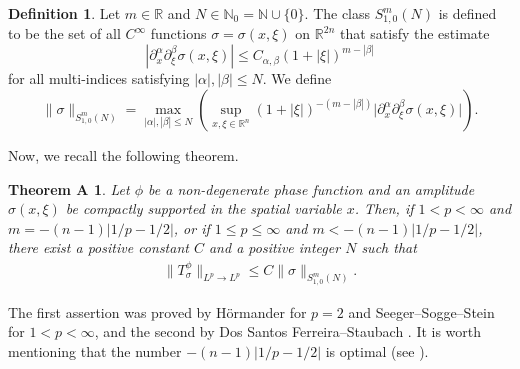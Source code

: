 \documentclass[12pt]{amsart}
\numberwithin{equation}{section}
\theoremstyle{plain}
\newtheorem*{referthmA}{Theorem A}
\theoremstyle{definition}
\newtheorem{defn}[thm]{Definition}
\newcommand{\N}{\mathbb{N}}
\newcommand{\R}{\mathbb{R}}
\begin{document}
\begin{defn} \label{def-Sm10} 
Let $m\in \R$ and $N \in \N_{0} = \N \cup \{0\}$. 
The class $S^{m}_{1,0} (N)$ 
is defined to be the set of all 
$C^{\infty}$ functions $\sigma = \sigma (x, \xi)$ 
on $\R^{2n}$ 
that satisfy the estimate 
\begin{equation*} 
\left|
\partial^{\alpha}_{x} 
\partial^{\beta}_{\xi} 
\sigma (x, \xi)
\right| 
\le 
C_{\alpha, \beta} 
\left( 1+ |\xi|\right)^{m-|\beta|}
\end{equation*}
for all multi-indices satisfying
$|\alpha|, |\beta| \le N$.
We define
\[
\| \sigma \|_{ S_{1,0}^{m} (N) }
= \max_{ |\alpha|, |\beta| \le N }
\left( \sup_{x, \xi \in \R^n}
\left( 1+ |\xi| \right)^{-(m-|\beta|)}
\big| 
\partial^{\alpha}_{x} 
\partial^{\beta}_{\xi} 
\sigma (x, \xi)
\big|
\right) .
\]
\end{defn}

Now, we recall the following theorem.

\begin{referthmA}
Let $\phi$ be a non-degenerate phase function 
and an amplitude $\sigma(x, \xi)$
be compactly supported in the spatial variable $x$.
Then, if $1 < p < \infty$ and $m = -(n-1) |1/p-1/2|$,
or if $1 \le p \le \infty$ and $m<-(n-1) |1/p-1/2|$,
there exist a positive constant $C$ 
and a positive integer $N$
such that 
\begin{align*}
\| T_{\sigma}^{\phi} \|_{L^p \to L^p}
\le C \| \sigma \|_{ S_{1,0}^{m} (N) }.
\end{align*}
\end{referthmA}

The first assertion was proved by
H\"ormander \cite{Hor1971} for $p=2$ and
Seeger--Sogge--Stein \cite{SSS} for $1 < p < \infty$,
and the second by
Dos Santos Ferreira--Staubach 
\cite[Theorems 2.1, 2.2, and 2.16]{DS}. 
It is worth mentioning that 
the number $-(n-1) |1/p-1/2|$
is optimal
(see \cite{M-wave}).
\end{document}
